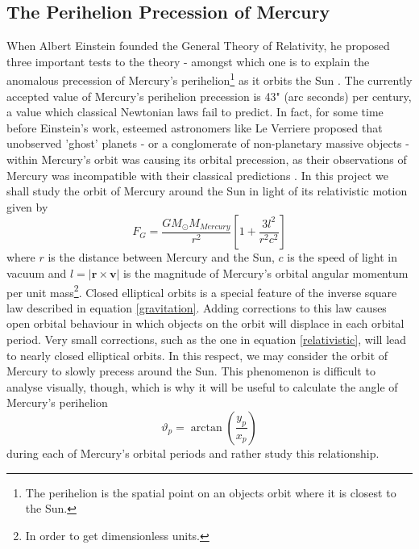 	\subsection{The Perihelion Precession of Mercury}
	When Albert Einstein founded the General Theory of Relativity, he proposed three important tests to the theory - amongst which one is to explain the anomalous precession of Mercury's perihelion\footnote{The perihelion is the spatial point on an objects orbit where it is closest to the Sun.} as it orbits the Sun \cite{einstein}. The currently accepted value of Mercury's perihelion precession is 43" (arc seconds) per century, a value which classical Newtonian laws fail to predict. In fact, for some time before Einstein's work, esteemed astronomers like Le Verriere proposed that unobserved 'ghost' planets - or a conglomerate of non-planetary massive objects - within Mercury's orbit was causing its orbital precession, as their observations of Mercury was incompatible with their classical predictions \cite{pollock}. In this project we shall study the orbit of Mercury around the Sun in light of its relativistic motion given by
	\begin{equation}
		F_G = \frac{GM_\odot M_{Mercury}}{r^2}\left[1+ \frac{3l^2}{r^2c^2}\right]
		\label{relativistic}
	\end{equation}
	where $r$ is the distance between Mercury and the Sun, $c$ is the speed of light in vacuum and $l = |\mathbf{r}\times\mathbf{v}|$ is the magnitude of Mercury's orbital angular momentum per unit mass\footnote{In order to get dimensionless units.}. Closed elliptical orbits is a special feature of the inverse square law described in equation \eqref{gravitation}. Adding corrections to this law causes open orbital behaviour in which objects on the orbit will displace in each orbital period. Very small corrections, such as the one in equation \eqref{relativistic}, will lead to nearly closed elliptical orbits. In this respect, we may consider the orbit of Mercury to slowly precess around the Sun. This phenomenon is difficult to analyse visually, though, which is why it will be useful to calculate the angle of Mercury's perihelion
	\begin{equation}
	\vartheta_p = \arctan\left(\frac{y_p}{x_p}\right)\label{thetaperihelion}
	\end{equation}
	during each of Mercury's orbital periods and rather study this relationship.